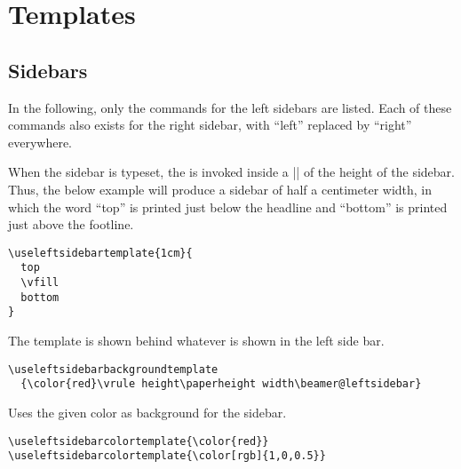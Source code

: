 
%


\section{Templates}

\label{section-customization}




\subsection{Sidebars}

\label{section-sidebar-templates}

In the following, only the commands for the left sidebars are
listed. Each of these commands also exists for the right sidebar,
with ``left'' replaced by ``right'' everywhere.


\begin{command}{\useleftsidebartemplate{}}
  When the sidebar is typeset, the  is invoked inside a
  |\vbox| of the height of the sidebar. Thus, the below example
  will produce a sidebar of half a centimeter width, in which the word
  ``top'' is printed just below the headline and ``bottom'' is printed
  just above the footline.
  \example
\begin{verbatim}
\useleftsidebartemplate{1cm}{
  top
  \vfill
  bottom
}
\end{verbatim}
\end{command}

\begin{command}{\useleftsidebarbackgroundtemplate{}}
  The template is shown behind whatever is shown in the left side
  bar. 
  \example
\begin{verbatim}
\useleftsidebarbackgroundtemplate
  {\color{red}\vrule height\paperheight width\beamer@leftsidebar}
\end{verbatim}
\end{command}


\begin{command}{\useleftsidebarcolortemplate{}}
  Uses the given color as background for the sidebar.
  \example
\begin{verbatim}
\useleftsidebarcolortemplate{\color{red}}
\useleftsidebarcolortemplate{\color[rgb]{1,0,0.5}}
\end{verbatim}
\end{command}

